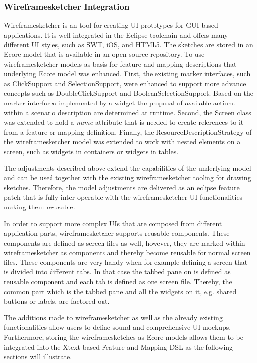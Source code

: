 \documentclass{sig-alternate-05-2015}
\begin{document}
\subsubsection{Wireframesketcher Integration}\label{sec:WireframesketcherIntegration} 
Wireframesketcher is an tool for creating UI prototypes for GUI based applications. 
It is well integrated in the Eclipse toolchain and offers many different UI styles, such as SWT, iOS, and HTML5.
The sketches are stored in an Ecore model that is available in an open source repository.
To use wireframesketcher models as basis for feature and mapping descriptions that underlying Ecore model was enhanced.
First, the existing marker interfaces, such as ClickSupport and SelectionSupport, were enhanced to support more advance concepts such as DoubleClickSupport and BooleanSelectionSupport.
Based on the marker interfaces implemented by a widget the proposal of available actions within a scenario description are determined at runtime.
Second, the Screen class was extended to hold a \textit{name} attribute that is needed to create references to it from a feature or mapping definition.
Finally, the ResourceDescriptionStrategy of the wireframesketcher model was extended to work with nested elements on a screen, such as widgets in containers or widgets in tables.

The adjustments described above extend the capabilities of the underlying model and can be used together with the existing wireframesketcher tooling for drawing sketches.
Therefore, the model adjustments are delivered as an eclipse feature patch that is fully inter operable with the wireframesketcher UI functionalities making them re-usable.

In order to support more complex UIs that are composed from different application parts, wireframesketcher supports reusable components.
These components are defined as screen files as well, however, they are marked within wireframesketcher as components and thereby become reusable for normal screen files.
These components are very handy when for example defining a screen that is divided into different tabs.
In that case the tabbed pane on is defined as reusable component and each tab is defined as one screen file.
Thereby, the common part which is the tabbed pane and all the widgets on it, e.g. shared buttons or labels, are factored out.

The additions made to wireframesketcher as well as the already existing functionalities allow users to define sound and comprehensive UI mockups. 
Furthermore, storing the wireframesketches as Ecore models allows them to be integrated into the Xtext based Feature and Mapping DSL as the following sections will illustrate.
\end{document}
